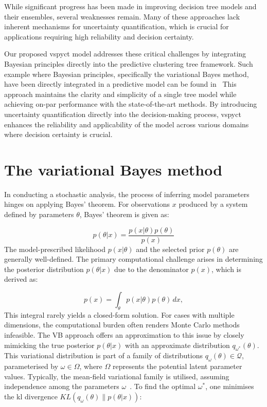 \documentclass[3p,review,authoryear]{elsarticle}
\begin{document}
While significant progress has been made in improving decision tree models and their ensembles, several weaknesses remain.
Many of these approaches lack inherent mechanisms for uncertainty quantification, which is crucial for applications requiring high reliability and decision certainty.

Our proposed \gls{vspyct} model addresses these critical challenges by integrating Bayesian principles directly into the predictive clustering tree framework.
Such example where Bayesian principles, specifically the variational Bayes method, have been directly integrated in a predictive model can be found in~\cite{Bo_koski_2021, lopez2023informative}
This approach maintains the clarity and simplicity of a single tree model while achieving on-par performance with the state-of-the-art methods.
By introducing uncertainty quantification directly into the decision-making process, \gls{vspyct} enhances the reliability and applicability of the model across various domains where decision certainty is crucial.


\section{The variational Bayes method}

In conducting a stochastic analysis, the process of inferring model parameters hinges on applying Bayes' theorem.
For observations $x$ produced by a system defined by parameters $\theta$, Bayes' theorem is given as:

\begin{equation}
p(\theta|x)=\frac{p(x|\theta)p(\theta)}{p(x)}
\label{eq:bayes_rule}
\end{equation}
The model-prescribed likelihood $p(x|\theta)$ and the selected prior $p(\theta)$ are generally well-defined.
The primary computational challenge arises in determining the posterior distribution $p(\theta|x)$ due to the denominator $p(x)$, which is derived as:

\begin{equation}
p(x)=\int_{\theta} p(x|\theta)p(\theta) \,dx,
\label{eq:evidence}
\end{equation}
This integral rarely yields a closed-form solution.
For cases with multiple dimensions, the computational burden often renders Monte Carlo methods infeasible.
The VB approach offers an approximation to this issue by closely mimicking the true posterior $p(\theta|x)$ with an approximate distribution $q_{\omega^*}(\theta)$. This variational distribution is part of a family of distributions $q_\omega(\theta)\in \mathcal{Q}$, parameterised by $\omega \in \Omega$, where $\Omega$ represents the potential latent parameter values.
Typically, the mean-field variational family is utilised, assuming independence among the parameters $\omega$~\citep{Blei_2017}. 
To find the optimal $\omega^*$, one minimises the \gls{kl} divergence $KL(q_\omega(\theta) \parallel p(\theta|x))$:
\end{document}
